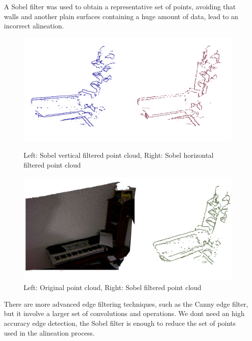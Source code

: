 A Sobel filter was used to obtain a representative set of points, avoiding that walls and another 
plain surfaces containing a huge amount of data, lead to an incorrect alineation.

\begin{figure}[h!]
\begin{center}
\includegraphics[scale=0.35]{images/sobel_v_h.png}
\caption{Left: Sobel vertical filtered point cloud, Right: Sobel horizontal filtered point cloud}
\end{center}

\begin{center}
\includegraphics[scale=0.35]{images/sobel_o_g.png}
\caption{Left: Original point cloud, Right: Sobel filtered point cloud}
\end{center}
\end{figure}

There are more advanced edge filtering techniques, such as the Canny edge filter, but it involve 
a larger set of convolutions and operations. We dont need an high accuracy edge detection, the Sobel 
filter is enough to reduce the set of points used in the alineation process.

